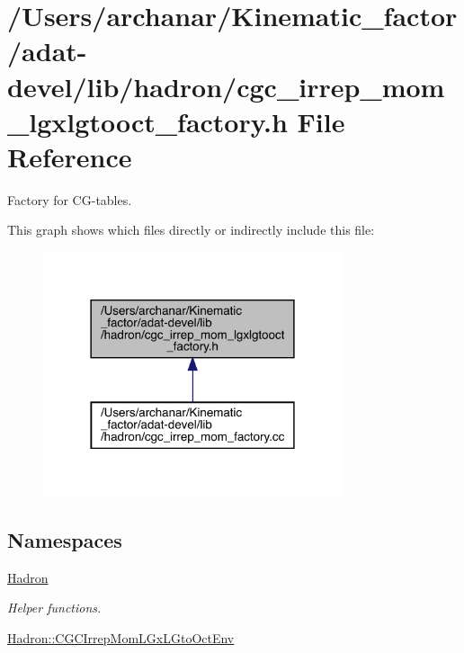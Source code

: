 \hypertarget{adat-devel_2lib_2hadron_2cgc__irrep__mom__lgxlgtooct__factory_8h}{}\section{/\+Users/archanar/\+Kinematic\+\_\+factor/adat-\/devel/lib/hadron/cgc\+\_\+irrep\+\_\+mom\+\_\+lgxlgtooct\+\_\+factory.h File Reference}
\label{adat-devel_2lib_2hadron_2cgc__irrep__mom__lgxlgtooct__factory_8h}


Factory for C\+G-\/tables.  


This graph shows which files directly or indirectly include this file\+:
\nopagebreak
\begin{figure}[H]
\begin{center}
\leavevmode
\includegraphics[width=249pt]{d6/db9/adat-devel_2lib_2hadron_2cgc__irrep__mom__lgxlgtooct__factory_8h__dep__incl}
\end{center}
\end{figure}
\subsection*{Namespaces}
\begin{DoxyCompactItemize}
\item 
 \mbox{\hyperlink{namespaceHadron}{Hadron}}
\begin{DoxyCompactList}\small\item\em Helper functions. \end{DoxyCompactList}\item 
 \mbox{\hyperlink{namespaceHadron_1_1CGCIrrepMomLGxLGtoOctEnv}{Hadron\+::\+C\+G\+C\+Irrep\+Mom\+L\+Gx\+L\+Gto\+Oct\+Env}}
\end{DoxyCompactItemize}
